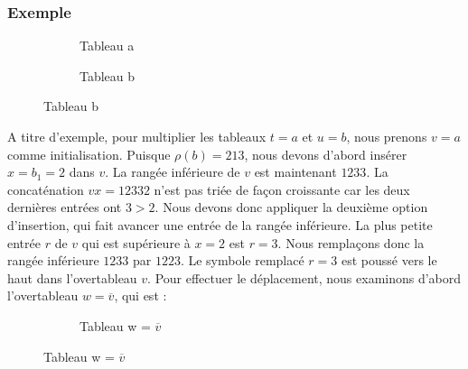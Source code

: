 \subsubsection{Exemple}
\begin{figure}[!ht]
	\centering
	\begin{subfigure}[b]{0.4\linewidth}
		\centering
		\caption{Tableau a}
		\label{fig:tab8}
	\end{subfigure}
	\begin{subfigure}[b]{0.4\linewidth}
		\centering
		\caption{Tableau b}
		\label{fig:tab9}
	\end{subfigure}
	\label{fig:tabs4}
\end{figure}
A titre d'exemple, pour multiplier les tableaux $t = a$ et $u = b$, nous prenons $v = a$ comme initialisation. 
Puisque $\rho(b) = 213$, nous devons d'abord insérer $x = b_1 = 2$ dans $v$. 
La rangée inférieure de $v$ est maintenant $1233$. 
La concaténation $vx = 12332$ n'est pas triée de façon croissante car les deux dernières entrées ont $3 > 2$. 
Nous devons donc appliquer la deuxième option d'insertion, qui fait avancer une entrée de la rangée inférieure. 
La plus petite entrée $r$ de $v$ qui est supérieure à $x = 2$ est $r = 3$. Nous remplaçons donc la rangée inférieure $1233$ par $1223$. 
Le symbole remplacé $r = 3$ est poussé vers le haut dans l'overtableau $v$. 
Pour effectuer le déplacement, nous examinons d'abord l'overtableau $w = \overline{v}$, qui est :
\begin{figure}[!ht]
	\centering
	\begin{subfigure}[b]{0.4\linewidth}
		\centering
		\caption{Tableau w = $\overline{v}$}
		\label{fig:tab10}
	\end{subfigure}
	\label{fig:tabs5}
\end{figure}
